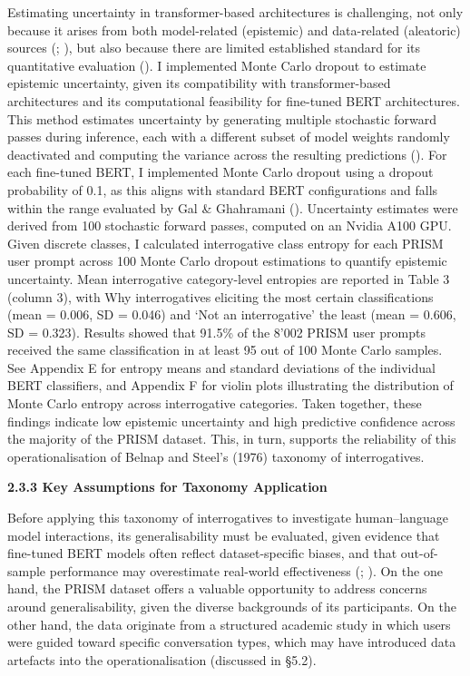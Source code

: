 \documentclass[
  12pt,
]{article}
\begin{document}
Estimating uncertainty in transformer-based architectures is challenging, not only because it arises from both model-related (epistemic) and data-related (aleatoric) sources (; ), but also because there are limited established standard for its quantitative evaluation (). I implemented Monte Carlo dropout to estimate epistemic uncertainty, given its compatibility with transformer-based architectures and its computational feasibility for fine-tuned BERT architectures. This method estimates uncertainty by generating multiple stochastic forward passes during inference, each with a different subset of model weights randomly deactivated and computing the variance across the resulting predictions (). For each fine-tuned BERT, I implemented Monte Carlo dropout using a dropout probability of 0.1, as this aligns with standard BERT configurations and falls within the range evaluated by Gal \& Ghahramani (). Uncertainty estimates were derived from 100 stochastic forward passes, computed on an Nvidia A100 GPU. Given discrete classes, I calculated interrogative class entropy for each PRISM user prompt across 100 Monte Carlo dropout estimations to quantify epistemic uncertainty. Mean interrogative category-level entropies are reported in Table 3 (column 3), with Why interrogatives eliciting the most certain classifications (mean = 0.006, SD = 0.046) and `Not an interrogative' the least (mean = 0.606, SD = 0.323). Results showed that 91.5\% of the 8'002 PRISM user prompts received the same classification in at least 95 out of 100 Monte Carlo samples. See Appendix E for entropy means and standard deviations of the individual BERT classifiers, and Appendix F for violin plots illustrating the distribution of Monte Carlo entropy across interrogative categories. Taken together, these findings indicate low epistemic uncertainty and high predictive confidence across the majority of the PRISM dataset. This, in turn, supports the reliability of this operationalisation of Belnap and Steel's (1976) taxonomy of interrogatives.

\textbf{2.3.3 Key Assumptions for Taxonomy Application}

Before applying this taxonomy of interrogatives to investigate human--language model interactions, its generalisability must be evaluated, given evidence that fine-tuned BERT models often reflect dataset-specific biases, and that out-of-sample performance may overestimate real-world effectiveness (; ). On the one hand, the PRISM dataset offers a valuable opportunity to address concerns around generalisability, given the diverse backgrounds of its participants. On the other hand, the data originate from a structured academic study in which users were guided toward specific conversation types, which may have introduced data artefacts into the operationalisation (discussed in §5.2).
\end{document}
